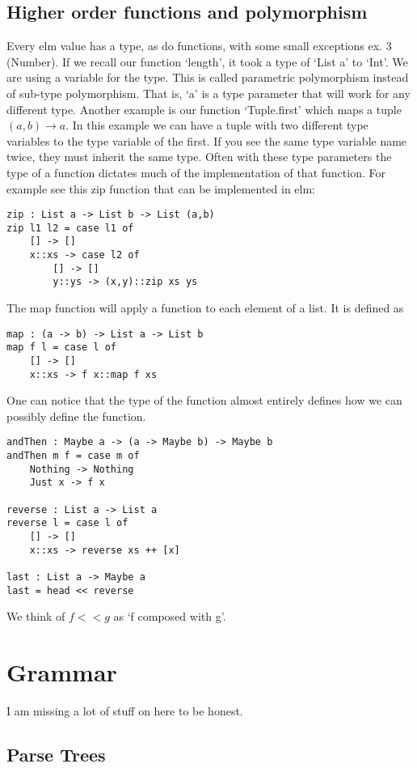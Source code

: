 \documentclass{article}
\theoremstyle{definition}
\begin{document}
\subsection{Higher order functions and polymorphism}
Every elm value has a type, as do functions, with some small exceptions ex. 3 (Number).
If we recall our function `length', it took a type of `List a' to `Int'. We are using a variable 
for the type. This is called parametric polymorphism instead of sub-type polymorphism. That is, `a' is 
a type parameter that will work for any different type. Another example is our function `Tuple.first' which 
maps a tuple $(a,b) \to a$. In this example we can have a tuple with two different type variables to the type 
variable of the first. If you see the same type variable name twice, they must inherit the same type.
Often with these type parameters the type of a function dictates much of the implementation of that function. For example see this zip function that can be implemented in elm:
\begin{mdframed}
	\begin{verbatim}
zip : List a -> List b -> List (a,b)
zip l1 l2 = case l1 of
    [] -> []
    x::xs -> case l2 of
        [] -> []
        y::ys -> (x,y)::zip xs ys
\end{verbatim}
\end{mdframed}
The map function will apply a function to each element of a list. It is defined as
\begin{verbatim}
map : (a -> b) -> List a -> List b
map f l = case l of
    [] -> []
    x::xs -> f x::map f xs
\end{verbatim}
One can notice that the type of the function almost entirely defines how we can possibly define the function.
\begin{verbatim}
andThen : Maybe a -> (a -> Maybe b) -> Maybe b
andThen m f = case m of
    Nothing -> Nothing
    Just x -> f x

reverse : List a -> List a
reverse l = case l of 
    [] -> []
    x::xs -> reverse xs ++ [x]

last : List a -> Maybe a
last = head << reverse
\end{verbatim}
We think of $f << g$ as `f composed with g'.
\section{Grammar}
I am missing a lot of stuff on here to be honest.
\subsection{Parse Trees}
\end{document}
